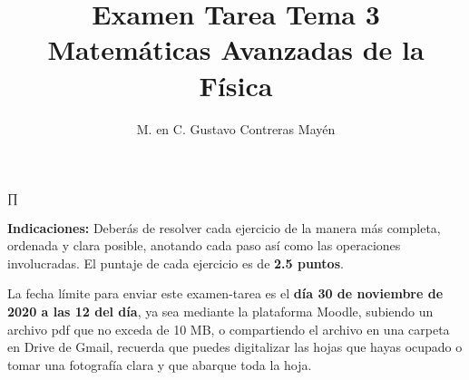 
\geometry{top=1.25cm, bottom=1.5cm, left=1.25cm, right=0.8cm}
\title{Examen Tarea Tema 3 \\ \large {Matemáticas Avanzadas de la Física}  \vspace{-3ex}}
\author{M. en C. Gustavo Contreras Mayén}
\date{ }
∏
\vspace{-4cm}
\maketitle
\fontsize{14}{14}\selectfont
\textbf{Indicaciones: } Deberás de resolver cada ejercicio de la manera más completa, ordenada y clara posible, anotando cada paso así como las operaciones involucradas. El puntaje de cada ejercicio es de \textbf{2.5 puntos}.
\par
La fecha límite para enviar este examen-tarea es el \textbf{día 30 de noviembre de 2020 a las 12 del día}, ya sea mediante la plataforma Moodle, subiendo un archivo pdf que no exceda de 10 MB, o compartiendo el archivo en una carpeta en Drive de Gmail, recuerda que puedes digitalizar las hojas que hayas ocupado o tomar una fotografía clara y que abarque toda la hoja.
